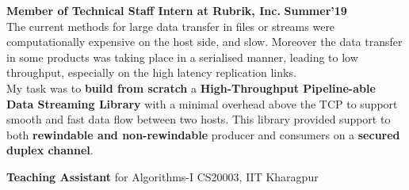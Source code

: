 \documentclass[10pt]{article}
\begin{document}
\vspace{-1.5ex}
\spacedhrule{0.15ex}{1.0ex}
\large {\textbf{Member of Technical Staff Intern at Rubrik, Inc.}} \normalsize
\href{https://github.com/shmundhra/Credentials/tree/master/Internships} {\hspace{0.5ex}\faMousePointer}
{\hfill} \textbf{Summer'19}\\[0.1em]%
The current methods for large data transfer in files or streams were computationally expensive on the host side, and slow. Moreover the data transfer in some products was taking place in a serialised manner, leading to low throughput, especially on the high latency replication links.\\
My task was to \textbf{build from scratch} a \textbf{High-Throughput Pipeline-able Data Streaming Library} with a minimal overhead above the TCP to support smooth and fast data flow between two hosts. This library provided support to both \textbf{rewindable and non-rewindable} producer and consumers on a \textbf{secured duplex channel}.
\iffalse
\begin{itemize}
\item Designed a High Throughput Streaming Library for data transfer over a \textbf{Secured TCP Connection} as an API to user.\\[-1.9em]
\item Implemented a \textbf{duplex server-client stream} where each end can be a rewindable/non-rewindable   producer/consumer.\\[-1.9em]
\item \textbf{Designed} the response, request and error packet \textbf{headers} and the \textbf{protocol} to be followed from scratch.\\[-1.9em]
\item Used \textbf{thread-per-connection concurrency control} mechanism and maintained synchronisation between threads using \textbf{mutex lock wrappers} to avoid the producer-consumer and stream registration race conditions.\\[-2em]
\end{itemize}
\fi
\vspace{-0.5ex}
\spacedhrule{0.15ex}{1.0ex}
\large { \textbf{Teaching Assistant} for Algorithms-I CS20003, IIT Kharagpur} \normalsize
\end{document}
